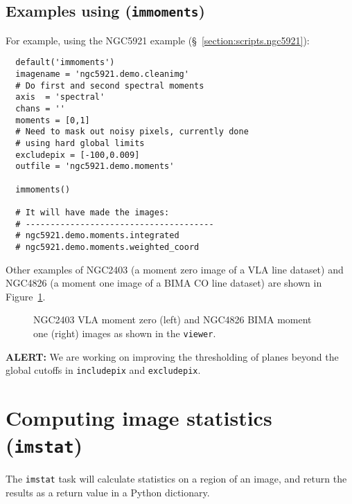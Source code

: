 \subsection{Examples using ({\tt immoments})}
\label{section:analysis.moments.example}

For example, using the NGC5921 example (\S~\ref{section:scripts.ngc5921}):
\small
\begin{verbatim}
  default('immoments')
  imagename = 'ngc5921.demo.cleanimg'
  # Do first and second spectral moments
  axis  = 'spectral'
  chans = ''
  moments = [0,1]
  # Need to mask out noisy pixels, currently done
  # using hard global limits
  excludepix = [-100,0.009]
  outfile = 'ngc5921.demo.moments'
  
  immoments()
  
  # It will have made the images:
  # --------------------------------------
  # ngc5921.demo.moments.integrated
  # ngc5921.demo.moments.weighted_coord
\end{verbatim}
\normalsize

Other examples of NGC2403 (a moment zero image of a VLA line dataset)
and NGC4826 (a moment one image of a BIMA CO line dataset) are
shown in Figure~\ref{fig:n2403momzero}.

\begin{figure}[h!]
\begin{center}
\caption{\label{fig:n2403momzero} NGC2403 VLA moment zero (left) and
NGC4826 BIMA moment one (right) images as shown in the {\tt viewer}.}
\hrulefill
\end{center}
\end{figure}

{\bf ALERT:} We are working on improving the thresholding
of planes beyond the global cutoffs in {\tt includepix}
and {\tt excludepix}.

\section{Computing image statistics ({\tt imstat})}
\label{section:analysis.imstat}

The {\tt imstat} task will calculate statistics on a region of
an image, and return the results as a return value in a Python
dictionary.

